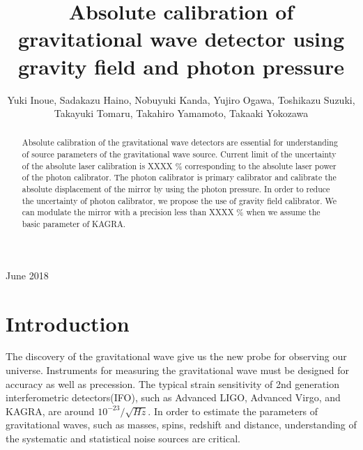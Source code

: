\documentclass[12pt]{iopart}
\begin{document}
\title[]{Absolute calibration of gravitational wave detector using gravity field and photon pressure}

\author{Yuki Inoue, Sadakazu Haino, Nobuyuki Kanda, Yujiro Ogawa, Toshikazu Suzuki, Takayuki Tomaru, Takahiro Yamamoto, Takaaki Yokozawa}

\address{IOP Publishing, Temple Circus, Temple Way, Bristol BS1 6HG, UK}
\vspace{10pt}
\begin{indented}
\item[]June 2018
\end{indented}

\begin{abstract}
Absolute calibration of the gravitational wave detectors are essential for understanding of source parameters of the gravitational wave source. Current limit of the uncertainty of the absolute laser calibration is XXXX \% corresponding to the absolute laser power of the photon calibrator. The photon calibrator is primary calibrator and calibrate the absolute displacement of the mirror by using the photon pressure. In order to reduce the uncertainty of photon calibrator, we propose the use of gravity field calibrator. We can modulate the mirror with a precision less than XXXX \% when we assume the basic parameter of KAGRA.
\end{abstract}

%
%
%
% 
%



\section{Introduction}

The discovery of the gravitational wave give us the new probe for observing our universe. 
Instruments for measuring the gravitational wave must be designed for accuracy as well as precession.
The typical strain sensitivity of 2nd generation interferometric detectors(IFO), such as Advanced LIGO, Advanced Virgo, and KAGRA, are around $10^{-23}/\sqrt{Hz}$. In order to estimate the parameters of gravitational waves, such as masses, spins, redshift and distance, understanding of the systematic and statistical noise sources are critical.
\end{document}
